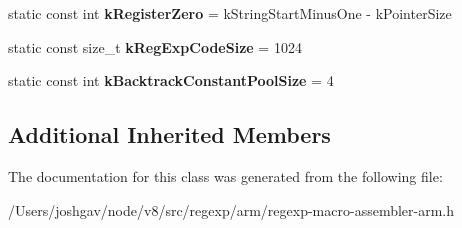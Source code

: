 \begin{DoxyCompactItemize}
\item 
static const int {\bfseries k\+Register\+Zero} = k\+String\+Start\+Minus\+One -\/ k\+Pointer\+Size\hypertarget{classv8_1_1internal_1_1_reg_exp_macro_assembler_a_r_m_a7f115f13a00fe4e4f2f3bb168459b5e4}{}\label{classv8_1_1internal_1_1_reg_exp_macro_assembler_a_r_m_a7f115f13a00fe4e4f2f3bb168459b5e4}

\item 
static const size\+\_\+t {\bfseries k\+Reg\+Exp\+Code\+Size} = 1024\hypertarget{classv8_1_1internal_1_1_reg_exp_macro_assembler_a_r_m_a021d298d05c19b911912c459c4396e3d}{}\label{classv8_1_1internal_1_1_reg_exp_macro_assembler_a_r_m_a021d298d05c19b911912c459c4396e3d}

\item 
static const int {\bfseries k\+Backtrack\+Constant\+Pool\+Size} = 4\hypertarget{classv8_1_1internal_1_1_reg_exp_macro_assembler_a_r_m_aee0e114ce4db2b6e187b6a23d9efed91}{}\label{classv8_1_1internal_1_1_reg_exp_macro_assembler_a_r_m_aee0e114ce4db2b6e187b6a23d9efed91}

\end{DoxyCompactItemize}
\subsection*{Additional Inherited Members}


The documentation for this class was generated from the following file\+:\begin{DoxyCompactItemize}
\item 
/\+Users/joshgav/node/v8/src/regexp/arm/regexp-\/macro-\/assembler-\/arm.\+h\end{DoxyCompactItemize}
